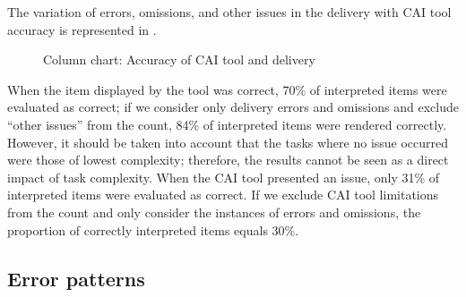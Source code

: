 The variation of errors, omissions, and other issues in the delivery with CAI tool accuracy is represented in .
\begin{figure}
    
    \caption{Column chart: Accuracy of CAI tool and delivery }
    \label{fig:16}
\end{figure}

When the item displayed by the tool was correct, 70\% of interpreted items were evaluated as correct; if we consider only delivery errors and omissions and exclude ``other issues'' from the count, 84\% of interpreted items were rendered correctly. However, it should be taken into account that the tasks where no issue occurred were those of lowest complexity; therefore, the results cannot be seen as a direct impact of task complexity. When the CAI tool presented an issue, only 31\% of interpreted items were evaluated as correct. If we exclude CAI tool limitations from the count and only consider the instances of errors and omissions, the proportion of correctly interpreted items equals 30\%.







\subsection{Error patterns}

